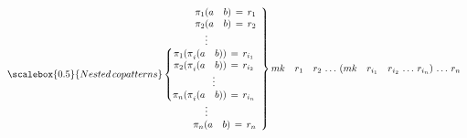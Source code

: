 \begin{equation}
\left. \begin{array}{r} { \pi  }_{ 1 }(a\quad b)\, =\, { r }_{ 1 } \\ { \pi  }_{ 2 }(a\quad b)\, =\, { r }_{ 2 } \\ \vdots \quad \quad \quad \quad \quad \\ \scalebox{0.5}{Nested\,copatterns}\left\{ \begin{matrix} { \pi  }_{ 1 }{ (\pi  }_{ { i } }(a\quad b))\, =\, { r }_{ { i }_{ 1 } } \\ { \pi  }_{ { 2 } }{ (\pi  }_{ { i } }(a\quad b))\, =\, { r }_{ { i }_{ 2 } } \\ \vdots  \\ { \pi  }_{ { n } }{ (\pi  }_{ { i } }(a\quad b))\, =\, { r }_{ { i }_{ n } } \end{matrix} \right.  \\ \vdots \quad \quad \quad \quad \quad \\ { \pi  }_{ n }(a\quad b)\, =\, { r }_{ n } \end{array} \right\} mk\quad { r }_{ 1 }\quad { r }_{ 2 }\, \dots \, (mk\quad { r }_{ { i }_{ 1 } }{ \quad r }_{ { i }_{ 2 } }\, \dots \, { r }_{ { i }_{ n } })\, \dots \, { r }_{ n }
\end{equation}